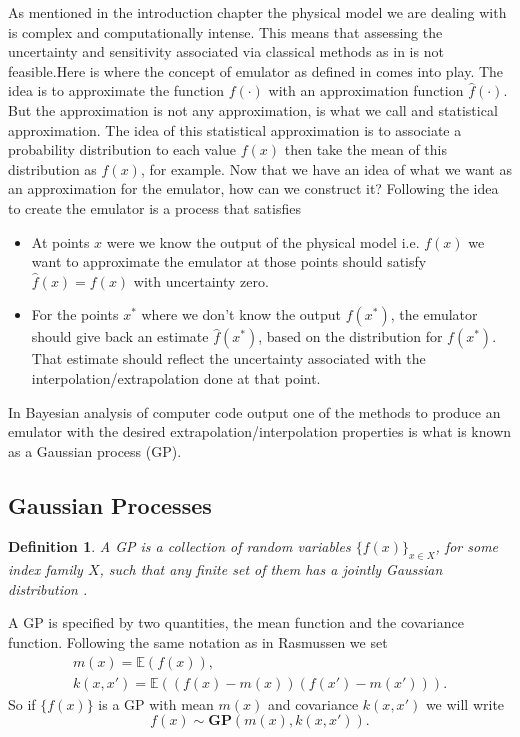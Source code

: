 \documentclass[12pt]{book}
\newtheorem{definition}{Definition}
\newcommand{\E}{\mathbb{E}} %
\begin{document}
As mentioned in the introduction chapter the physical model we are dealing with is complex 
and computationally intense.
This means that assessing the uncertainty and sensitivity  associated via classical methods as in 
\cite{saltelli2000sensitivity} is not feasible.Here is where the concept of emulator as defined in \cite{o2006bayesian} comes into play. The idea is to 
approximate the function $f(\cdot)$ with an approximation function $\hat{f}(\cdot)$. But the approximation
is not any approximation, is what we call and statistical approximation. The idea of this statistical 
approximation is to associate a probability distribution to each value $f(x)$ then take the mean
of this distribution as $\hat{f}(x)$, for example.
\newline
Now that we have an idea of what we want as an approximation for the emulator, how can we construct it?
Following \cite{o2006bayesian} the idea to create the emulator is a process that satisfies
\begin{itemize}
\item At points $x$  were we know the output of the physical model i.e. $f(x)$  we want to approximate
the emulator at those points should satisfy $\hat{f}(x)=f(x)$ with uncertainty zero.
\item For the points $x^{*}$ where we don't know the output $f(x^{*})$, the emulator should
give back an estimate $\hat{f}(x^{*})$, based on the distribution for $f(x^{*})$. 
That estimate should reflect the uncertainty associated with
the interpolation/extrapolation done at that point.
\end{itemize} 



In Bayesian analysis of computer code output one of the methods to produce an emulator with the desired
extrapolation/interpolation properties is what is known as a  Gaussian process (GP). 

\subsection{Gaussian Processes}

\begin{definition}\label{dfnGP}
A GP is a collection of random variables $\{f(x)\}_{x\in X}$, for some index family $X$,
 such that any finite set of them has a jointly
Gaussian distribution \cite{rasmussen2006gaussian}. 
\end{definition}

A GP is specified by two quantities, the mean function and the covariance function. 
Following the same notation as in Rasmussen \cite{rasmussen2006gaussian} we set
\begin{eqnarray*}
m(x)=\E(f(x)),\\
k(x,x')=\E((f(x)-m(x))(f(x')-m(x'))).
\end{eqnarray*}
So if $\{f(x)\}$ is a GP with mean $m(x)$ and covariance $k(x,x')$ we will write
\begin{equation*}
f(x)\sim \textbf{GP}(m(x),k(x,x')).
\end{equation*} 
\end{document}
